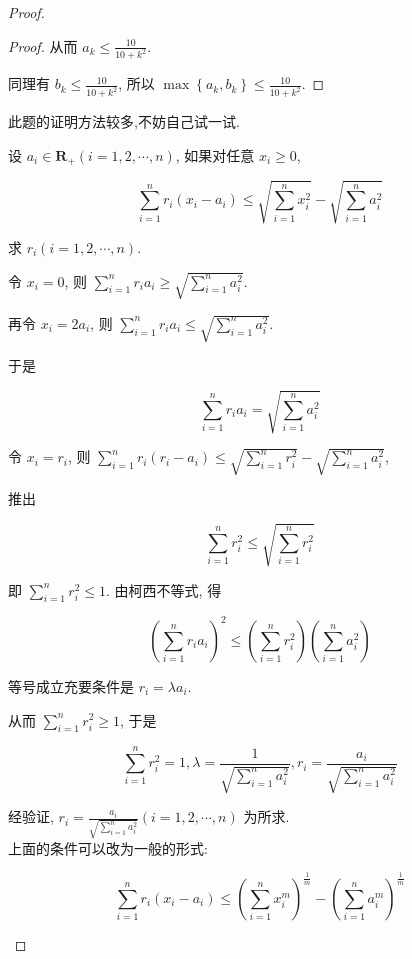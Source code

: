 \begin{proof}
\begin{proof}
	从而 $a_{k} \leqslant \frac{10}{10+k^{2}}$.
	
	同理有 $b_{k} \leqslant \frac{10}{10+k^{2}}$, 所以 $\max \left\{a_{k}, b_{k}\right\} \leqslant \frac{10}{10+k^{2}}$.
\end{proof}
\begin{note}
	此题的证明方法较多,不妨自己试一试.
\end{note}

\begin{example}
	设 $a_{i} \in \mathbf{R}_{+}(i=1,2, \cdots, n)$, 如果对任意 $x_{i} \geqslant 0$,
	
	$$
	\sum_{i=1}^{n} r_{i}\left(x_{i}-a_{i}\right) \leqslant \sqrt{\sum_{i=1}^{n} x_{i}^{2}}-\sqrt{\sum_{i=1}^{n} a_{i}^{2}}
	$$
	
	求 $r_{i}(i=1,2, \cdots, n)$.
\end{example}
\begin{solution}
	令 $x_{i}=0$, 则 $\sum_{i=1}^{n} r_{i} a_{i} \geqslant \sqrt{\sum_{i=1}^{n} a_{i}^{2}}$.
	
	再令 $x_{i}=2 a_{i}$, 则 $\sum_{i=1}^{n} r_{i} a_{i} \leqslant \sqrt{\sum_{i=1}^{n} a_{i}^{2}}$.
	
	于是
	
	$$
	\sum_{i=1}^{n} r_{i} a_{i}=\sqrt{\sum_{i=1}^{n} a_{i}^{2}}
	$$
	
	令 $x_{i}=r_{i}$, 则 $\sum_{i=1}^{n} r_{i}\left(r_{i}-a_{i}\right) \leqslant \sqrt{\sum_{i=1}^{n} r_{i}^{2}}-\sqrt{\sum_{i=1}^{n} a_{i}^{2}}$,
	
	推出
	
	$$
	\sum_{i=1}^{n} r_{i}^{2} \leqslant \sqrt{\sum_{i=1}^{n} r_{i}^{2}}
	$$
	
	即 $\sum_{i=1}^{n} r_{i}^{2} \leqslant 1$. 由柯西不等式, 得
	
	$$
	\left(\sum_{i=1}^{n} r_{i} a_{i}\right)^{2} \leqslant\left(\sum_{i=1}^{n} r_{i}^{2}\right)\left(\sum_{i=1}^{n} a_{i}^{2}\right)
	$$
	
	等号成立充要条件是 $r_{i}=\lambda a_{i}$.
	
	从而 $\sum_{i=1}^{n} r_{i}^{2} \geqslant 1$, 于是
	
	$$
	\sum_{i=1}^{n} r_{i}^{2}=1, \lambda=\frac{1}{\sqrt{\sum_{i=1}^{n} a_{i}^{2}}}, r_{i}=\frac{a_{i}}{\sqrt{\sum_{i=1}^{n} a_{i}^{2}}}
	$$
	
	经验证, $r_{i}=\frac{a_{i}}{\sqrt{\sum_{i=1}^{n} a_{i}^{2}}}(i=1,2, \cdots, n)$ 为所求.\\
	上面的条件可以改为一般的形式:
	
	$$
	\sum_{i=1}^{n} r_{i}\left(x_{i}-a_{i}\right) \leqslant\left(\sum_{i=1}^{n} x_{i}^{m}\right)^{\frac{1}{m}}-\left(\sum_{i=1}^{n} a_{i}^{m}\right)^{\frac{1}{m}}
	$$
	

\end{solution}
\end{proof}
